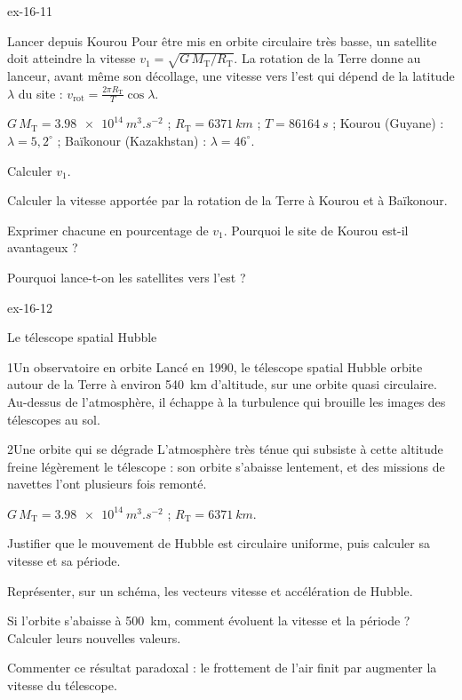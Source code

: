 \begin{blocLivre}{ex-16-11}
\begin{exercice}[2]{Lancer depuis Kourou}
Pour être mis en orbite circulaire très basse, un satellite doit atteindre la vitesse $v_1=\sqrt{G\,M_\mathrm{T}/R_\mathrm{T}}$. La
rotation de la Terre donne au lanceur, avant même son décollage, une vitesse vers l'est qui dépend de la latitude
$\lambda$ du site : $v_\mathrm{rot}=\frac{2\pi R_\mathrm{T}}{T}\cos\lambda$.
\begin{donnees}
$G\,M_\mathrm{T}=\qty{3,98e14}{m^3.s^{-2}}$ ; $R_\mathrm{T}=\qty{6371}{km}$ ; $T=\qty{86164}{s}$ ; Kourou (Guyane) : $\lambda=5{,}2^\circ$ ;
Baïkonour (Kazakhstan) : $\lambda=46^\circ$.
\end{donnees}
\begin{questions}
\item Calculer $v_1$.
\item Calculer la vitesse apportée par la rotation de la Terre à Kourou et à Baïkonour.
\item Exprimer chacune en pourcentage de $v_1$. Pourquoi le site de Kourou est-il avantageux ?
\item Pourquoi lance-t-on les satellites vers l'est ?
\end{questions}
\end{exercice}
\end{blocLivre}
\begin{blocLivre}{ex-16-12}
\begin{exercice}[3]{Le télescope spatial Hubble}
\begin{docu}{1}{Un observatoire en orbite}
Lancé en 1990, le télescope spatial Hubble orbite autour de la Terre à environ 540~km d'altitude, sur une orbite
quasi circulaire. Au-dessus de l'atmosphère, il échappe à la turbulence qui brouille les images des télescopes au sol.
\end{docu}
\begin{docu}{2}{Une orbite qui se dégrade}
L'atmosphère très ténue qui subsiste à cette altitude freine légèrement le télescope : son orbite s'abaisse lentement,
et des missions de navettes l'ont plusieurs fois remonté.
\end{docu}
\begin{donnees}
$G\,M_\mathrm{T}=\qty{3,98e14}{m^3.s^{-2}}$ ; $R_\mathrm{T}=\qty{6371}{km}$.
\end{donnees}
\begin{questions}
\item Justifier que le mouvement de Hubble est circulaire uniforme, puis calculer sa vitesse et sa période.
\item Représenter, sur un schéma, les vecteurs vitesse et accélération de Hubble.
\item \initiative Si l'orbite s'abaisse à 500~km, comment évoluent la vitesse et la période ? Calculer leurs nouvelles valeurs.
\item Commenter ce résultat paradoxal : le frottement de l'air finit par augmenter la vitesse du télescope.
\end{questions}
\end{exercice}
\end{blocLivre}
